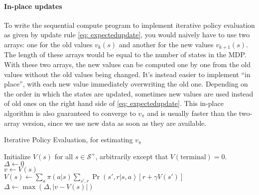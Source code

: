 \documentclass[12pt]{article}
\begin{document}
\paragraph{In-place updates} To write the sequential compute program to implement iterative policy evaluation as given by update rule \ref{eq: expectedupdate}, you would naively have to use two arrays: one for the old values $v_k(s)$ and another for the new values $v_{k+1}(s)$. The length of these arrays would be equal to the number of states in the MDP. With these two arrays, the new values can be computed one by one from the old values without the old values being changed. It's instead easier to implement ``in place'', with each new value immediately overwriting the old one. Depending on the order in which the states are updated, sometimes new values are used instead of old ones on the right hand side of \ref{eq: expectedupdate}. This in-place algorithm is also guaranteed to converge to $v_\pi$ and is usually faster than the two-array version, since we use new data as soon as they are available.

\begin{algorithm}
  \caption{Iterative Policy Evaluation, for estimating $v_\pi$} 
  Initialize $V(s)$ for all $s \in \mathcal S^+$, arbitrarily except that   $V(\textrm{terminal}) = 0$. \\
\While{$\Delta \geq \theta$} {
  $\Delta \gets 0$ \\
   {
    $v \gets V(s)$\\
    $V(s) \gets \sum_a \pi(a|s) \sum_{s',r} \Pr(s', r| s, a) \left[ r + \gamma       V(s')\right]$ \\
    $\Delta \gets \max\left(\Delta, |v - V(s)|\right)$ \hspace{35pt} 
  }
}
\end{algorithm}
\end{document}
